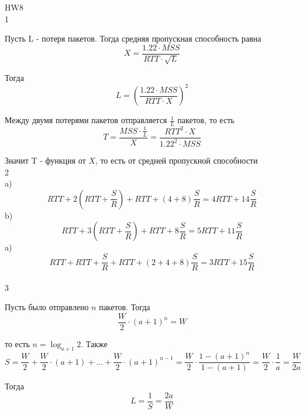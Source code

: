 \documentclass[a4paper,11pt]{article}
\begin{document}
\Large
HW8
\\
1

Пусть L - потеря пакетов. Тогда средняя пропускная способность равна
$$X = \frac{1.22 \cdot MSS}{RTT \cdot \sqrt{L}}$$

Тогда
$$L = (\frac{1.22 \cdot MSS}{RTT \cdot X})^2$$

Между двумя потерями пакетов отправляется $\frac{1}{L}$ пакетов, то есть 
$$T = \frac{MSS \cdot \frac{1}{L}}{X}  = \frac{RTT^2 \cdot X}{1.22^2 \cdot MSS}$$

Значит T - функция от $X$, то есть от средней пропускной способности
\\
2
\\
a) $$RTT + 2(RTT + \frac{S}{R}) + RTT + (4 + 8)\frac{S}{R} = 4RTT + 14\frac{S}{R}$$
b) $$RTT + 3(RTT + \frac{S}{R}) + RTT + 8\frac{S}{R}  = 5RTT + 11\frac{S}{R}$$
a) $$RTT + RTT + \frac{S}{R} + RTT + (2 + 4 + 8)\frac{S}{R} = 3RTT + 15\frac{S}{R}$$
\\
3

Пусть было отправлено $n$ пакетов. Тогда $$\frac{W}{2} \cdot (a + 1)^n = W$$ 

то есть $n = \log_{a + 1}2$. Также 
$$S = \frac{W}{2} + \frac{W}{2} \cdot (a + 1) + ... + \frac{W}{2} \cdot (a + 1)^{n - 1} = \frac{W}{2} \cdot \frac{1 - (a + 1)^n}{1 - (a + 1)} = \frac{W}{2} \cdot \frac{1}{a} = \frac{W}{2a}$$

Тогда $$L = \frac{1}{S} = \frac{2a}{W}$$
\end{document}
